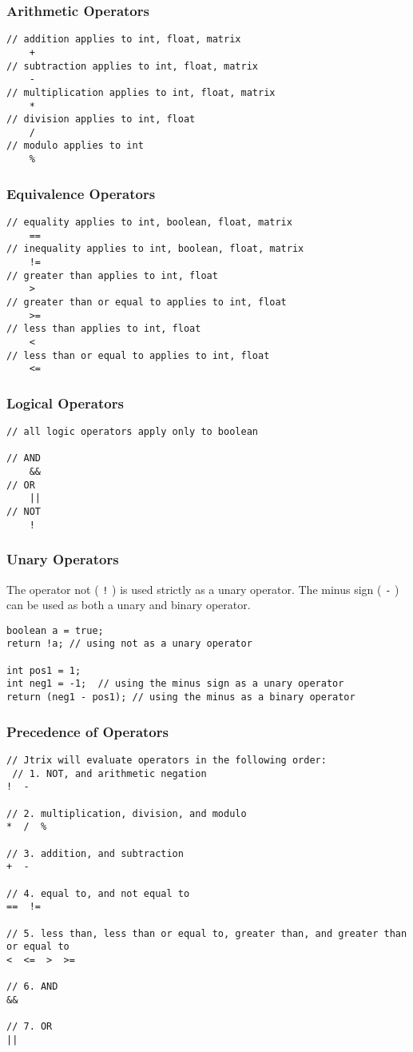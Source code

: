 \documentclass[12pt]{report}
\begin{document}
\subsubsection{Arithmetic Operators}
\begin{lstlisting}
// addition applies to int, float, matrix
	+
// subtraction applies to int, float, matrix
	-
// multiplication applies to int, float, matrix
	*
// division applies to int, float
	/
// modulo applies to int
	%
\end{lstlisting}
\subsubsection{Equivalence Operators}
\begin{lstlisting}
// equality applies to int, boolean, float, matrix
	==
// inequality applies to int, boolean, float, matrix
	!=
// greater than applies to int, float
	>
// greater than or equal to applies to int, float
	>=
// less than applies to int, float
	<
// less than or equal to applies to int, float
	<=
\end{lstlisting}

\subsubsection{Logical Operators}
\begin{lstlisting}
// all logic operators apply only to boolean

// AND
	&&
// OR
	||
// NOT
	!
\end{lstlisting}

\subsubsection{Unary Operators}
The operator not ( \texttt{!} ) is used strictly as a unary operator. The minus sign ( \texttt{-} ) can be used as both a unary and binary operator.
\begin{lstlisting}
boolean a = true;
return !a; // using not as a unary operator

int pos1 = 1; 
int neg1 = -1;  // using the minus sign as a unary operator
return (neg1 - pos1); // using the minus as a binary operator
\end{lstlisting}

\subsubsection{Precedence of Operators}
\begin{lstlisting}
// Jtrix will evaluate operators in the following order:
 // 1. NOT, and arithmetic negation
!  - 

// 2. multiplication, division, and modulo
*  /  %

// 3. addition, and subtraction
+  - 

// 4. equal to, and not equal to
==  !=

// 5. less than, less than or equal to, greater than, and greater than or equal to
<  <=  >  >=

// 6. AND
&&

// 7. OR
||
\end{lstlisting}
\end{document}
